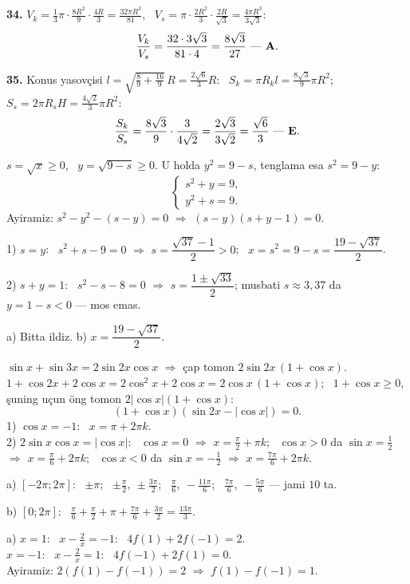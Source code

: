 \textbf{34.} $V_k=\frac13\pi\cdot\frac{8R^2}9\cdot\frac{4R}3=\frac{32\pi R^3}{81}$, \ $V_s=\pi\cdot\frac{2R^2}3\cdot\frac{2R}{\sqrt3}=\frac{4\pi R^3}{3\sqrt3}$:
\[\frac{V_k}{V_s}=\frac{32\cdot3\sqrt3}{81\cdot4}=\frac{8\sqrt3}{27}\ \text{— \textbf{A}}.\]

\textbf{35.} Konus yasovçisi $l=\sqrt{\frac{8}9+\frac{16}9}\,R=\frac{2\sqrt6}3R$: \ $S_k=\pi R_kl=\frac{8\sqrt3}9\pi R^2$; \ $S_s=2\pi R_sH=\frac{4\sqrt2}3\pi R^2$:
\[\frac{S_k}{S_s}=\frac{8\sqrt3}9\cdot\frac3{4\sqrt2}=\frac{2\sqrt3}{3\sqrt2}=\frac{\sqrt6}3\ \text{— \textbf{E}}.\]

\newpage
{}
$s=\sqrt x\ge0$, \ $y=\sqrt{9-s}\ge0$. U holda $y^2=9-s$, tenglama esa $s^2=9-y$:
\[\begin{cases}s^2+y=9,\\ y^2+s=9.\end{cases}\]
Ayiramiz: $s^2-y^2-(s-y)=0$ $\Rightarrow$ $(s-y)(s+y-1)=0$.

1) $s=y$: \ $s^2+s-9=0$ $\Rightarrow$ $s=\dfrac{\sqrt{37}-1}2>0$; \ $x=s^2=9-s=\dfrac{19-\sqrt{37}}2$.

2) $s+y=1$: \ $s^2-s-8=0$ $\Rightarrow$ $s=\dfrac{1\pm\sqrt{33}}2$; musbati $s\approx3{,}37$ da $y=1-s<0$ — mos emas.

a) Bitta ildiz. \quad b) $x=\dfrac{19-\sqrt{37}}2$.

\newpage
{}
$\sin x+\sin3x=2\sin2x\cos x$ $\Rightarrow$ çap tomon $2\sin2x\,(1+\cos x)$.\\
$1+\cos2x+2\cos x=2\cos^2x+2\cos x=2\cos x\,(1+\cos x)$; \ $1+\cos x\ge0$, şuning uçun öng tomon $2|\cos x|(1+\cos x)$:
\[(1+\cos x)\left(\sin2x-|\cos x|\right)=0.\]
1) $\cos x=-1$: \ $x=\pi+2\pi k$.\\
2) $2\sin x\cos x=|\cos x|$: \ $\cos x=0$ $\Rightarrow$ $x=\frac\pi2+\pi k$; \ $\cos x>0$ da $\sin x=\frac12$ $\Rightarrow$ $x=\frac\pi6+2\pi k$; \ $\cos x<0$ da $\sin x=-\frac12$ $\Rightarrow$ $x=\frac{7\pi}6+2\pi k$.

a) $[-2\pi;2\pi]$: \ $\pm\pi$; \ $\pm\frac\pi2,\ \pm\frac{3\pi}2$; \ $\frac\pi6,\ -\frac{11\pi}6$; \ $\frac{7\pi}6,\ -\frac{5\pi}6$ — jami $10$ ta.

b) $[0;2\pi]$: \ $\frac\pi6+\frac\pi2+\pi+\frac{7\pi}6+\frac{3\pi}2=\frac{13\pi}3$.

\newpage
{}
a) $x=1$: \ $x-\frac2x=-1$: \ $4f(1)+2f(-1)=2$.\\
\phantom{a) }$x=-1$: \ $x-\frac2x=1$: \ $4f(-1)+2f(1)=0$.\\
Ayiramiz: $2\left(f(1)-f(-1)\right)=2$ $\Rightarrow$ $f(1)-f(-1)=1$.

